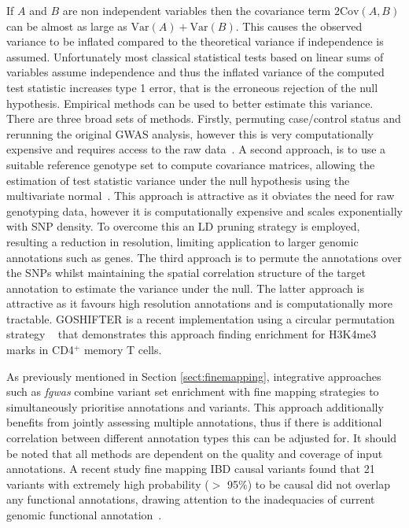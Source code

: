 \documentclass[a4paper,11pt]{report}
\begin{document}
If $A$ and $B$ are non independent variables then the covariance term $2\text{Cov}(A,B)$ can be almost as large as $\text{Var}(A) + \text{Var}(B)$. This causes the observed variance to be inflated compared to the theoretical variance if independence is assumed. Unfortunately most classical statistical tests based on linear sums of variables assume independence and thus the inflated variance of the computed test statistic increases type 1 error, that is the erroneous rejection of the null hypothesis. Empirical methods can be used to better estimate this variance. There are three broad sets of methods. Firstly, permuting case/control status and rerunning the original GWAS analysis, however this is very computationally expensive and requires access to the raw data~\citep{Evangelou2014-ed}. A second approach, is to use a suitable reference genotype set to compute covariance matrices, allowing the estimation of test statistic variance under the null hypothesis using the multivariate normal~\citep{LiuMcRaeNyholtEtAl2010,Burren2014-vh}. This approach is attractive as it obviates the need for raw genotyping data, however it is computationally expensive and scales exponentially with SNP density. To overcome this an LD pruning strategy is employed, resulting a reduction in resolution,  limiting application to larger genomic annotations such as genes. The third approach is to permute the annotations over the SNPs whilst maintaining the spatial correlation structure of the target annotation to estimate the variance under the null. The latter approach is attractive as it favours high resolution annotations and is computationally more tractable. GOSHIFTER is a recent implementation using a circular permutation strategy ~\citep{Trynka2015-wz} that demonstrates this approach finding enrichment for H3K4me3 marks in CD4$^{+}$ memory T cells. 

As previously mentioned in Section \ref{sect:finemapping}, integrative approaches such as \textit{fgwas} combine variant set enrichment with fine mapping strategies to simultaneously prioritise annotations and variants. This approach additionally benefits from jointly assessing multiple annotations, thus if there is additional correlation between different annotation types this can be adjusted for.  It should be noted that all methods are dependent on the quality and coverage of input annotations. A recent study fine mapping IBD causal variants found that 21 variants with extremely high probability ($>$ 95$\%$) to be causal did not overlap any functional annotations, drawing attention to the inadequacies of current genomic functional annotation~\citep{Huang2015-ug}.
\end{document}
